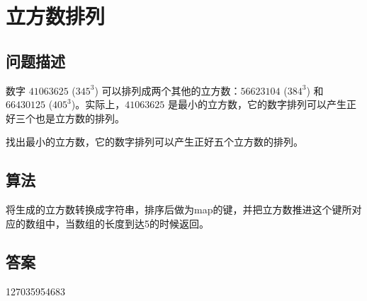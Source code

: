 \section{立方数排列}
\subsection{问题描述}
\begin{tcolorbox}
数字 \(41063625\) (\(345^3\)) 可以排列成两个其他的立方数：\(56623104\) (\(384^3\)) 和 \(66430125\) (\(405^3\))。实际上，\(41063625\) 是最小的立方数，它的数字排列可以产生正好三个也是立方数的排列。

找出最小的立方数，它的数字排列可以产生正好五个立方数的排列。
\end{tcolorbox}

\subsection{算法}
将生成的立方数转换成字符串，排序后做为map的键，并把立方数推进这个键所对应的数组中，当数组的长度到达5的时候返回。

\subsection{答案}
127035954683
